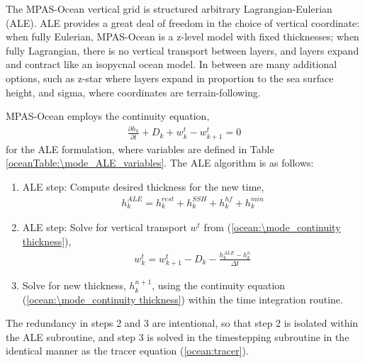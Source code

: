 The MPAS-Ocean vertical grid is structured arbitrary Lagrangian-Eulerian (ALE).   ALE provides a great deal of freedom in the choice of vertical coordinate: when fully Eulerian, MPAS-Ocean is a z-level model with fixed thicknesses; when fully Lagrangian, there is no vertical transport between layers, and layers expand and contract like an isopycnal ocean model.  In between are many additional options, such as z-star where layers expand in proportion to the sea surface height, and sigma, where coordinates are terrain-following.

MPAS-Ocean employs the continuity equation,
\begin{eqnarray}
\label{ocean:\mode_continuity thickness}
\frac{\partial h_{k}}{\partial t} + D_k + w^t_k - w^t_{k+1} =0
\end{eqnarray}
for the ALE formulation, where variables are defined in Table \ref{oceanTable:\mode_ALE_variables}.  The ALE algorithm is as follows:
\begin{enumerate}
\item ALE step: Compute desired thickness for the new time,
\begin{eqnarray}
\label{ocean:\mode_desired thickness}
h_k^{ALE} = h_k^{rest} + h_k^{SSH} + h_k^{hf} + h_k^{min}
\end{eqnarray}
\item ALE step: Solve for vertical transport $w^t$ from (\ref{ocean:\mode_continuity thickness}),
\begin{eqnarray}
\label{ocean:\mode vert tranport}
w^t_k = w^t_{k+1} - D_k - \frac{h^{ALE}_k - h^n_k}{\Delta t}
\end{eqnarray}
\item Solve for new thickness, $h_{k}^{n+1}$, using the continuity equation (\ref{ocean:\mode_continuity thickness}) within the time integration routine.
\end{enumerate}
The redundancy in steps 2 and 3 are intentional, so that step 2 is isolated within the ALE subroutine, and step 3 is solved in the timestepping subroutine in the identical manner as the tracer equation (\ref{ocean:tracer}).

